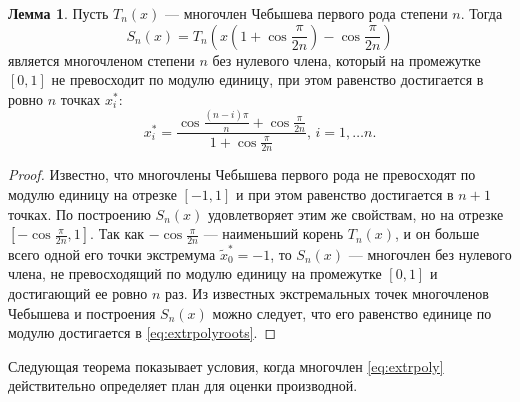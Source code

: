 \documentclass[specialist,
               substylefile = spbu.rtx,
               subf,href,colorlinks=true, 12pt]{disser}
\theoremstyle{definition}
\newtheorem{lemma}{Лемма}
\begin{document}
  \begin{lemma}
  \label{lemma:extrpoly}
  Пусть $T_n(x)$ --- многочлен Чебышева первого рода степени $n$. Тогда 
  	\begin{equation}
  	\label{eq:extrpoly}
  		S_n(x) = T_n \left(x \left(1 + \cos \frac{\pi}{2n} \right) - \cos \frac{\pi}{2n} \right)
	\end{equation}   
	является многочленом степени $n$ без нулевого члена, который на промежутке $[0, 1]$ не превосходит по модулю единицу, при этом равенство достигается в ровно $n$ точках $x^*_i$:
	\begin{equation}
	\label{eq:extrpolyroots}
		x_i^* = \frac{\cos \frac{(n - i) \pi}{n} + \cos \frac{\pi}{2n}}{1 + \cos \frac{\pi}{2n}} , \, i = 1, \ldots n.
	\end{equation}
  \end{lemma}
  
  \begin{proof}
  	Известно, что многочлены Чебышева первого рода не превосходят по модулю единицу на отрезке $[-1, 1]$ и при этом равенство достигается в $n+1$ точках. По построению $S_n(x)$ удовлетворяет этим же свойствам, но на отрезке $[-\cos \frac{\pi}{2 n}, 1]$. Так как $-\cos \frac{\pi}{2 n}$ --- наименьший корень $T_n(x)$, и он больше всего одной его точки экстремума $\tilde{x}_0^* = -1$, то $S_n(x)$ --- многочлен без нулевого члена, не превосходящий по модулю единицу на промежутке $[0, 1]$ и достигающий ее ровно $n$ раз. Из известных экстремальных точек многочленов Чебышева и построения $S_n(x)$ можно следует, что его равенство единице по модулю достигается в \eqref{eq:extrpolyroots}.
  \end{proof}
  
  Следующая теорема показывает условия, когда многочлен \eqref{eq:extrpoly} действительно определяет план для оценки производной. 
	
\end{document}

